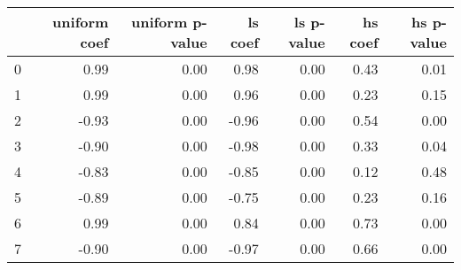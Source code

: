 \begin{tabular}{lrrrrrr}
\toprule
 & uniform coef & uniform p-value & ls coef & ls p-value & hs coef & hs p-value \\
\midrule
0 & 0.99 & 0.00 & 0.98 & 0.00 & 0.43 & 0.01 \\
1 & 0.99 & 0.00 & 0.96 & 0.00 & 0.23 & 0.15 \\
2 & -0.93 & 0.00 & -0.96 & 0.00 & 0.54 & 0.00 \\
3 & -0.90 & 0.00 & -0.98 & 0.00 & 0.33 & 0.04 \\
4 & -0.83 & 0.00 & -0.85 & 0.00 & 0.12 & 0.48 \\
5 & -0.89 & 0.00 & -0.75 & 0.00 & 0.23 & 0.16 \\
6 & 0.99 & 0.00 & 0.84 & 0.00 & 0.73 & 0.00 \\
7 & -0.90 & 0.00 & -0.97 & 0.00 & 0.66 & 0.00 \\
\bottomrule
\end{tabular}
